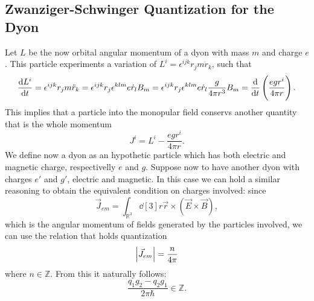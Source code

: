 \documentclass[main.tex]{subfiles}
\begin{document}
\subsection{Zwanziger-Schwinger Quantization for the Dyon}
Let $L$ be the now orbital angular momentum of a dyon with mass $m$ and charge $e$. This particle experiments a variation of $L^i=\epsilon^{ijk}r_jm\dot r_k$, such that
\begin{align}
\dv{L^i}{t}=\epsilon^{ijk}r_jm\ddot r_k=\epsilon^{ijk}r_j\epsilon^{klm}e\dot r_lB_m=\epsilon^{ijk}r_j\epsilon^{klm}e\dot r_l\frac{g}{4\pi r^3}B_m=\dv{}{t}\left(\frac{egr^i}{4\pi r}\right).
\end{align}
This implies that a particle into the monopular field conservs another quantity that is the whole momentum
\begin{equation}
J^i=L^i-\frac{egr^i}{4\pi r}.
\end{equation}
We define now a dyon as an hypothetic particle which has both electric and magnetic charge, respectivelly $e$ and $g$. Suppose now to have another dyon with charges $e'$ and $g'$, electric and magnetic. In this case we can hold a similar reasoning to obtain the equivalent condition on charges involved: since
\begin{equation}
\vec J_{em}=\int_{\mathbb{R}^3}\dd[3]{r}\vec r\times\left(\vec E\times\vec B\right),
\end{equation}
which is the angular momentum of fields generated by the particles involved, we can use the relation that holds quantization
\begin{equation}
\abs{\vec J_{em}}=\frac{n}{4\pi}
\end{equation}
where $n\in\mathbb{Z}$.
From this it naturally follows:
\begin{equation}
\frac{q_1g_2-q_2g_1}{2\pi\hbar} \in \mathbb{Z}.
\end{equation}
\end{document}
